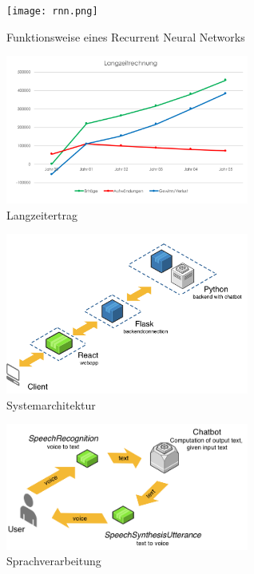 \documentclass{aa}
\begin{document}
         \begin{figure}[h]
         \centering
         \texttt{[image: rnn.png]}
         \caption{Funktionsweise eines Recurrent Neural Networks}
         \label{fig:rnn}
        \end{figure}
        
         \begin{figure}[h]
         \centering
         \includegraphics[width=8cm]{Langzeitertrag.png}
         \caption{Langzeitertrag}
         \label{fig:Langzeitertrag}
        \end{figure}
         
         \begin{figure}[h]
         \centering
         \includegraphics[width=8cm]{systemarchitektur_v2.png}
         \caption{Systemarchitektur}
         \label{fig:Systemarchitektur}
        \end{figure}
        
        \begin{figure}[h]
         \centering
         \includegraphics[width=8cm]{voice_v2.png}
         \caption{Sprachverarbeitung}
         \label{fig:Sprachverarbeitung}
        \end{figure}
        
\end{document}
